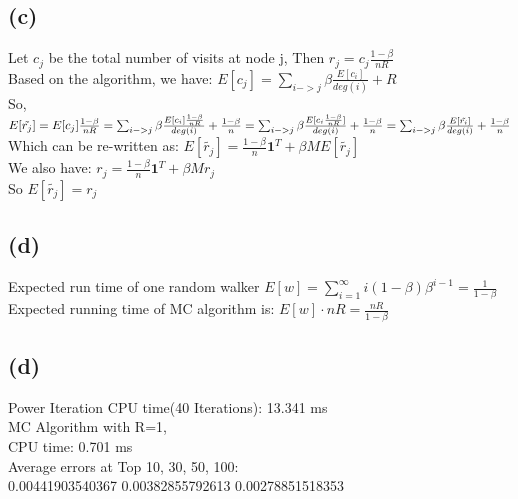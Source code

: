 \documentclass{article}
\begin{document}
\subsection{(c)}
Let $c_j$ be the total number of visits at node j, Then $r_j = c_j\frac{1-\beta}{nR}$\\
Based on the algorithm, we have: $E[c_j] = \sum_{i->j} \beta \frac{E[c_i]}{deg(i)} + R$ \\
So, $E[\tilde{r_j}] = E[c_j]\frac{1-\beta}{nR} = \sum_{i->j} \beta \frac{E[c_i]\frac{1-\beta}{nR}}{deg(i)} + \frac{1-\beta}{n} \\
= \sum_{i->j} \beta \frac{E[c_i\frac{1-\beta}{nR}]}{deg(i)} + \frac{1-\beta}{n} \\
= \sum_{i->j} \beta \frac{E[\tilde{r_i}]}{deg(i)} + \frac{1-\beta}{n}$ \\
Which can be re-written as: $E[\tilde{r_j}] = \frac{1-\beta}{n}\textbf{1}^T + \beta ME[\tilde{r_j}]$ \\
We also have: $r_j = \frac{1-\beta}{n}\textbf{1}^T + \beta Mr_j$ \\
So $E[\tilde{r_j}] = r_j$


\subsection{(d)}
Expected run time of one random walker $E[w] = \sum_{i=1}^{\infty}i(1-\beta)\beta^{i-1}=\frac{1}{1-\beta}$\\
Expected running time of MC algorithm is: $E[w]\cdot nR = \frac{nR}{1-\beta}$

\subsection{(d)}
Power Iteration CPU time(40 Iterations): 13.341 ms\\
MC Algorithm with R=1, \\
\indent CPU time: 0.701 ms\\
\indent Average errors at Top 10, 30, 50, 100:\\
0.00441903540367
0.00382855792613
0.00278851518353\\
\end{document}
